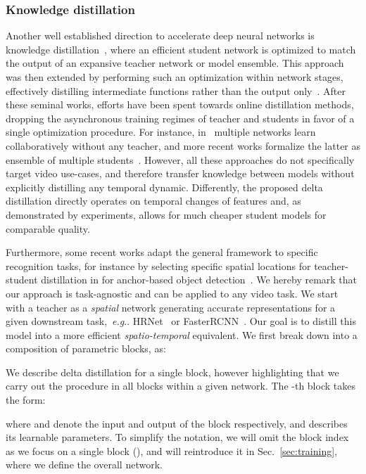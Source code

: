 \documentclass[runningheads]{llncs}
\makeatletter
\DeclareRobustCommand\onedot{\futurelet\@let@token\@onedot}
\def\@onedot{\ifx\@let@token.\else.\null\fi\xspace}
\def\eg{\emph{e.g}\onedot} \def\Eg{\emph{E.g}\onedot}
\makeatother
\begin{document}
\subsubsection{Knowledge distillation}
Another well established direction to accelerate deep neural networks is knowledge distillation~\cite{hinton}, where an efficient student network is optimized to match the output of an expansive teacher network or model ensemble.
This approach was then extended by performing such an optimization within network stages, effectively distilling intermediate functions rather than the output only~\cite{fitnets}.
After these seminal works, efforts have been spent towards online distillation methods, dropping the asynchronous training regimes of teacher and students in favor of a single optimization procedure.
For instance, in~\cite{zhang2018deep} multiple networks learn collaboratively without any teacher, and more recent works formalize the latter as ensemble of multiple students~\cite{zhu2018knowledge,guo2020online,wu2021peer}.
However, all these approaches do not specifically target video use-cases, and therefore transfer knowledge between models without explicitly distilling any temporal dynamic.
Differently, the proposed delta distillation directly operates on temporal changes of features and, as demonstrated by experiments, allows for much cheaper student models for comparable quality.

Furthermore, some recent works adapt the general framework to specific recognition tasks, for instance by selecting specific spatial locations for teacher-student distillation in for anchor-based object detection~\cite{dai2021general,fgfi}.
We hereby remark that our approach is task-agnostic and can be applied to any video task.
\label{sec:method}
We start with a teacher  as a \emph{spatial} network generating accurate representations for a given downstream task,~\eg HRNet~\cite{hrnet} or FasterRCNN~\cite{fasterrcnn}. Our goal is to distill this model into a more efficient \emph{spatio-temporal} equivalent. We first break  down into a composition of  parametric blocks, as:

We describe delta distillation for a single block, however highlighting that we carry out the procedure in all blocks within a given network.
The -th block  takes the form:

where  and  denote the input and output of the block respectively, and  describes its learnable parameters. To simplify the notation, we will omit the block index  as we focus on a single block (), and will reintroduce it in Sec.~\ref{sec:training}, where we define the overall network.
\end{document}
